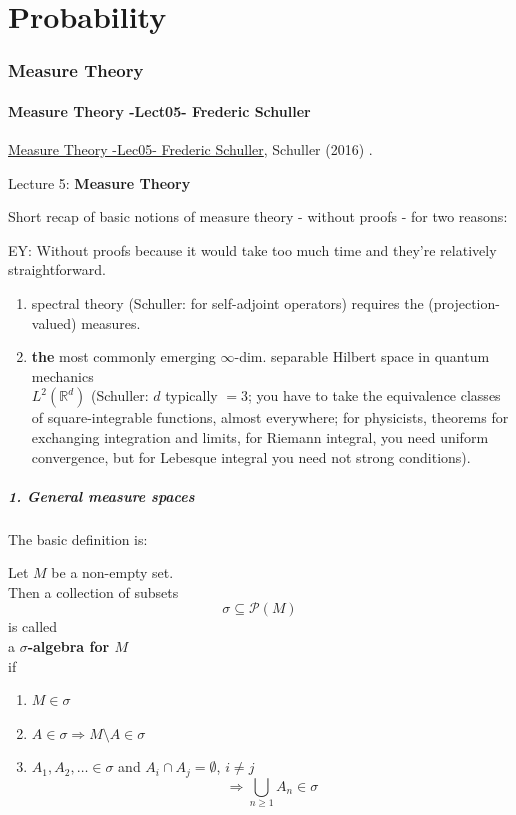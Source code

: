 \part{Probability}


\section{Measure Theory}

\subsection{Measure Theory -Lect05- Frederic Schuller}

\href{https://youtu.be/6ad9V8gvyBQ?si=c8X7MUMjokirSn0F}{Measure Theory -Lec05- Frederic Schuller}, Schuller (2016) \cite{agat:Schu2016}.

Lecture 5: \textbf{Measure Theory}

Short recap of basic notions of measure theory - without proofs - for two reasons:

EY: Without proofs because it would take too much time and they're relatively straightforward.

\begin{enumerate}
	\item spectral theory (Schuller: for self-adjoint operators) requires the (projection-valued) measures.
	\item \textbf{the} most commonly emerging $\infty$-dim. separable Hilbert space in quantum mechanics \\
	$L^2(\mathbb{R}^d)$ (Schuller: $d$ typically $=3$; you have to take the equivalence classes of square-integrable functions, almost everywhere; for physicists, theorems for exchanging integration and limits, for Riemann integral, you need uniform convergence, but for Lebesque integral you need not strong conditions). 
\end{enumerate}

\subsubsection{1. General measure spaces}

The basic definition is:
\begin{definition}
	Let $M$ be a non-empty set. \\
	Then a collection of subsets  
	\[
	\sigma \subseteq \mathcal{P}(M)
	\] is called \\
	a \textbf{$\sigma$-algebra for $M$} \\
	if \begin{enumerate}
		\item $M \in \sigma$ \\
		\item $A \in \sigma \Longrightarrow M  \setminus A \in \sigma$
		\item $A_1, A_2, \dots \in \sigma$ and $A_i \cap A_j = \emptyset$, $i\neq j$
		\[
		\Longrightarrow \bigcup_{n\geq 1} A_n \in \sigma
		\]
	\end{enumerate}
\end{definition}

